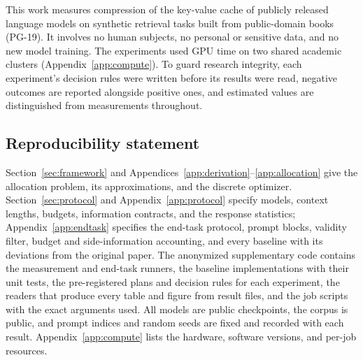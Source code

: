 \documentclass{article}
\theoremstyle{definition}
\begin{document}
This work measures compression of the key-value cache of publicly released language models on synthetic retrieval tasks built from public-domain books (PG-19).  It involves no human subjects, no personal or sensitive data, and no new model training.  The experiments used GPU time on two shared academic clusters (Appendix~\ref{app:compute}).  To guard research integrity, each experiment's decision rules were written before its results were read, negative outcomes are reported alongside positive ones, and estimated values are distinguished from measurements throughout.

\subsection*{Reproducibility statement}

Section~\ref{sec:framework} and Appendices~\ref{app:derivation}--\ref{app:allocation} give the allocation problem, its approximations, and the discrete optimizer.  Section~\ref{sec:protocol} and Appendix~\ref{app:protocol} specify models, context lengths, budgets, information contracts, and the response statistics; Appendix~\ref{app:endtask} specifies the end-task protocol, prompt blocks, validity filter, budget and side-information accounting, and every baseline with its deviations from the original paper.  The anonymized supplementary code contains the measurement and end-task runners, the baseline implementations with their unit tests, the pre-registered plans and decision rules for each experiment, the readers that produce every table and figure from result files, and the job scripts with the exact arguments used.  All models are public checkpoints, the corpus is public, and prompt indices and random seeds are fixed and recorded with each result.  Appendix~\ref{app:compute} lists the hardware, software versions, and per-job resources.




\clearpage
\appendix

\end{document}
